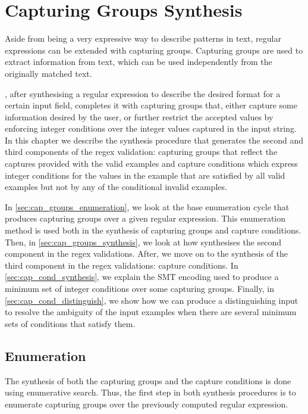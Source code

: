\chapter{Capturing Groups Synthesis}\label{chap:capture-cond-synthesis}

Aside from being a very expressive way to describe patterns in text, regular expressions can be extended with capturing groups.
%
Capturing groups are used to extract information from text, which can be used independently from the originally matched text.

\Forest, after synthesising a regular expression to describe the desired format for a certain input field, completes it with capturing groups that, either capture some information desired by the user, or further restrict the accepted values by enforcing integer conditions over the integer values captured in the input string.
%
In this chapter we describe the synthesis procedure that generates the second and third components of the regex validation: capturing groups that reflect the captures provided with the valid examples and capture conditions which express integer conditions for the values in the example that are satisfied by all valid examples but not by any of the conditional invalid examples.

In \autoref{sec:cap_groups_enumeration}, we look at the base enumeration cycle that produces capturing groups over a given regular expression. This enumeration method is used both in the synthesis of capturing groups and capture conditions. Then, in \autoref{sec:cap_groups_synthesis}, we look at how \Forest synthesises the second component in the regex validations. After, we move on to the synthesis of the third component in the regex validations: capture conditions. In \autoref{sec:cap_cond_synthesis}, we explain the SMT encoding used to produce a minimum set of integer conditions over some capturing groups. Finally, in \autoref{sec:cap_cond_distinguish}, we show how we can produce a distinguishing input to resolve the ambiguity of the input examples when there are several minimum sets of conditions that satisfy them.

    
\section{Enumeration}\label{sec:cap_groups_enumeration}
The synthesis of both the capturing groups and the capture conditions is done using enumerative search. Thus, the first step in both synthesis procedures is to enumerate capturing groups over the previously computed regular expression.

